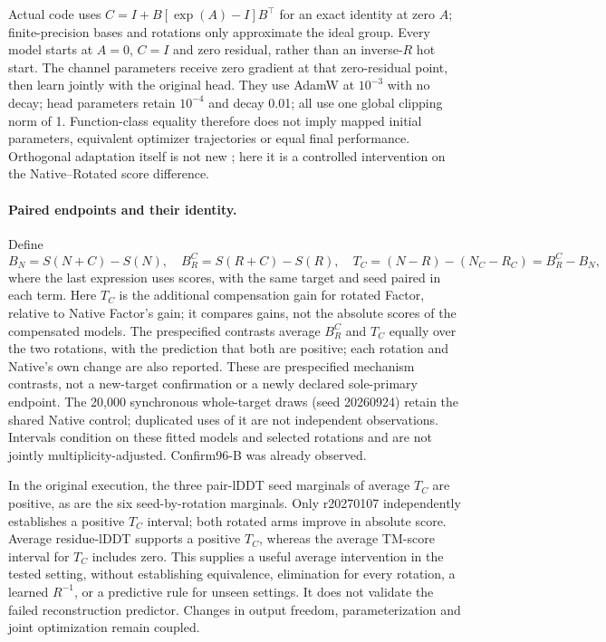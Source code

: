 Actual code uses $C=I+B[\exp(A)-I]B^\top$ for an exact identity at zero $A$;
finite-precision bases and rotations only approximate the ideal group.
Every model starts at $A=0$, $C=I$ and zero residual, rather than an inverse-$R$
hot start. The channel parameters receive zero gradient at that zero-residual
point, then learn jointly with the original head. They use AdamW at $10^{-3}$
with no decay; head parameters retain $10^{-4}$ and decay 0.01; all use one
global clipping norm of 1. Function-class equality therefore does not imply
mapped initial parameters, equivalent optimizer trajectories or equal final
performance. Orthogonal adaptation itself is not new
\citep{qiu2023oft,liu2023boft}; here it is a controlled intervention on the
Native--Rotated score difference.

\paragraph{Paired endpoints and their identity.}
Define
\begin{equation}
 B_N=S(N+C)-S(N),\quad B_R^{C}=S(R+C)-S(R),\quad
 T_C=(N-R)-(N_C-R_C)=B_R^{C}-B_N,
\end{equation}
where the last expression uses scores, with the same target and seed paired
in each term. Here $T_C$ is the additional compensation gain for rotated
Factor, relative to Native Factor's gain; it compares gains, not the absolute
scores of the compensated models. The prespecified contrasts average $B_R^{C}$
and $T_C$ equally over the two rotations, with the prediction that both are
positive; each rotation and Native's own change are also reported. These are
prespecified mechanism contrasts, not a new-target confirmation or a newly
declared sole-primary endpoint.
The 20,000 synchronous whole-target draws (seed 20260924) retain the shared
Native control; duplicated uses of it are not independent observations.
Intervals condition on these fitted models and selected rotations and are
not jointly multiplicity-adjusted. Confirm96-B was already observed.

In the original execution, the three pair-lDDT seed marginals of average $T_C$ are positive, as are the
six seed-by-rotation marginals. Only r20270107 independently establishes a
positive $T_C$ interval; both rotated arms improve in absolute score. Average
residue-lDDT supports a positive $T_C$, whereas the average TM-score interval
for $T_C$ includes zero.
This supplies a useful average intervention in the tested setting, without
establishing equivalence, elimination for every rotation, a learned $R^{-1}$,
or a predictive rule for unseen settings. It does not validate the failed
reconstruction predictor. Changes in output freedom, parameterization and
joint optimization remain coupled.

